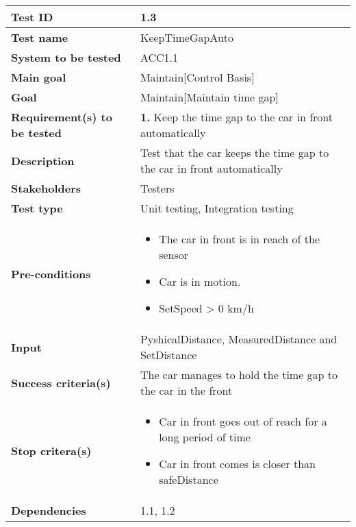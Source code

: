 	\begin{table}[H]
		\begin{tabular}{| p{4cm} | p{10cm} |}
		\hline
		\rowcolor{gray}
			\hline
			\rowcolor{gray}
			{\bf Test ID} & 1.3 \\ \hline
			{\bf Test name} & KeepTimeGapAuto \\ \hline
			{\bf System to be tested} & ACC1.1\\ \hline
			{\bf Main goal} & Maintain[Control Basis] \\ \hline
			{\bf Goal} & Maintain[Maintain time gap] \\ \hline
			{\bf Requirement(s) to be tested} & {\bf 1.} Keep the time gap to the car 
			in front automatically\\ \hline
			{\bf Description} & Test that the car keeps the time gap to the car in 
			front automatically\\ \hline
			{\bf Stakeholders} & Testers\\ \hline
			{\bf Test type} &  Unit testing, Integration testing \\ \hline
			{\bf Pre-conditions} & 
				\begin{itemize}
					\item The car in front is in reach of the sensor 
					\item Car is in motion.
					\item SetSpeed > 0 km/h
				\end{itemize}\\ \hline
			{\bf Input} & PyshicalDistance, MeasuredDistance and SetDistance\\ \hline
			{\bf Success criteria(s)}& The car manages to hold the time gap to the car 
			in the front\\ \hline
			{\bf Stop critera(s)} &  
				\begin{itemize}
					\item Car in front goes out of reach for a long period of time
					\item Car in front comes is closer than safeDistance
				\end{itemize}\\ \hline
			{\bf Dependencies} & 1.1,  1.2\\ \hline
		\end{tabular}
	\end{table}

